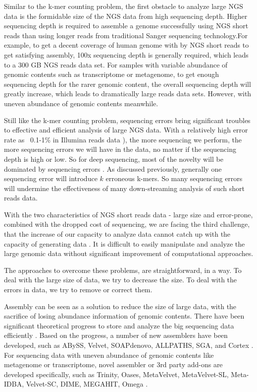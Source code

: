Similar to the k-mer counting problem, the first obstacle to analyze large NGS data
is the formidable size of 
the NGS data from high sequencing depth. Higher sequencing depth is 
required to assemble a genome successfully using NGS short reads than using 
longer reads from traditional Sanger sequencing technology.For example, to get
a decent coverage of human genome with by NGS short reads to get satisfying assembly, 
100x sequencing depth is generally required, which leads to a 300 GB NGS reads 
data set\cite{pubmed21187386}. For samples with variable abundance of genomic 
contents such as transcriptome or metagenome, to get enough sequencing depth for
the rarer genomic content, the overall sequencing depth will greatly increase, 
which leads to dramatically large reads data sets. However, with uneven
abundance of genomic contents meanwhile. 

Still like the k-mer counting problem, sequencing errors bring significant troubles
to effective and efficient analysis of large NGS data. With a relatively high 
error rate as ~0.1-1\% in Illumina reads data \cite{pubmed19997069}), the more 
sequencing we perform, the more sequencing errors we will have in the data, no 
matter if the sequencing depth is high or low. So for deep sequencing, most
of the novelty will be dominated by sequencing errors \cite{pubmed21245053}.
As discussed previously, generally one sequencing error will
introduce $k$ erroneous k-mers. So many sequencing errors will undermine the 
effectiveness of many down-streaming analysis of such short reads data.

With the two characteristics of NGS short reads data - large size and error-prone,
 combined with the dropped cost of sequencing, 
we are facing the third challenge, that the increase of our capacity to analyze data cannot
catch up with the capacity of generating data \cite{pubmed20441614}. It is difficult
to easily manipulate and analyze the large genomic data without significant improvement
of computational approaches.

The approaches to overcome these problems, are straightforward, in a way. To deal
with the large size of data, we try to decrease the size. To deal with the 
errors in data, we try to remove or correct them. 

Assembly can be seen as a solution to reduce the size of large data, with the 
sacrifice of losing abundance information of genomic contents. There have
been significant theoretical progress to store and analyze the big sequencing data
efficiently
\cite{pubmed22068540,pubmed20529929}. Based on the progress, a number of new 
assemblers have been developed,
such as ABySS, Velvet, SOAPdenovo, ALLPATHS, SGA, and Cortex
\cite{pubmed19251739,pubmed18349386,pubmed20511140,pubmed21187386,
pubmed22156294,Iqbal2012}. For sequencing data with uneven abundance of genomic contents
like metagenome or transcriptome, novel assembler or 3rd party add-ons are developed
specifically, such as Trinity, Oases, MetaVelvet, MetaVelvet-SL, Meta-IDBA, Velvet-SC, DIME, MEGAHIT, Omega
\cite{pubmed21572440,pubmed22368243,Namiki2012,Afiahayati2015, pubmed21685107,pubmed21926975,Guo2015,Li2015,Haider2014}.

